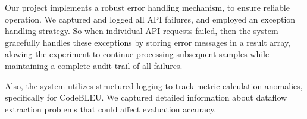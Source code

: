 Our project implements a robust error handling mechanism, to ensure reliable operation. We captured and logged all API failures, and employed an exception handling strategy. So when individual API requests failed, then the system gracefully handles these exceptions by storing error messages in a result array, alowing the experiment to continue processing subsequent samples while maintaining a complete audit trail of all failures.

Also, the system utilizes structured logging to track metric calculation anomalies, specifically for CodeBLEU. We captured detailed information about dataflow extraction problems that could affect evaluation accuracy. 

